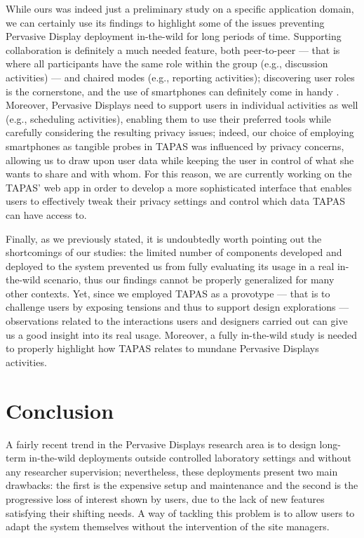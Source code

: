 While ours was indeed just a preliminary study on a specific application domain, we can certainly use its findings to highlight some of the issues preventing Pervasive Display deployment in-the-wild for long periods of time. Supporting collaboration is definitely a much needed feature, both peer-to-peer --- that is where all participants have the same role within the group (e.g., discussion activities) --- and chaired modes (e.g., reporting activities); discovering user roles is the cornerstone, and the use of smartphones can definitely come in handy \cite{Clinch:2013uj}. Moreover, Pervasive Displays need to support users in individual activities as well (e.g., scheduling activities), enabling them to use their preferred tools while carefully considering the resulting privacy issues; indeed, our choice of employing smartphones as tangible probes in \acs{TAPAS} was influenced by privacy concerns, allowing us to draw upon user data while keeping the user in control of what she wants to share and with whom. For this reason, we are currently working on the \acs{TAPAS}' web app in order to develop a more sophisticated interface that enables users to effectively tweak their privacy settings and control which data \acs{TAPAS} can have access to.

Finally, as we previously stated, it is undoubtedly worth pointing out the shortcomings of our studies: the limited number of components developed and deployed to the system prevented us from fully evaluating its usage in a real in-the-wild scenario, thus our findings cannot be properly generalized for many other contexts. Yet, since we employed \acs{TAPAS} as a provotype --- that is to challenge users by exposing tensions and thus to support design explorations \cite{Boer:2012ku} --- observations related to the interactions users and designers carried out can give us a good insight into its real usage. Moreover, a fully in-the-wild study is needed to properly highlight how \acs{TAPAS} relates to mundane Pervasive Displays activities.

\section{Conclusion}
A fairly recent trend in the Pervasive Displays research area is to design long-term in-the-wild deployments outside controlled laboratory settings and without any researcher supervision; nevertheless, these deployments present two main drawbacks: the first is the expensive setup and maintenance and the second is the progressive loss of interest shown by users, due to the lack of new features satisfying their shifting needs. A way of tackling this problem is to allow users to adapt the system themselves without the intervention of the site managers.


